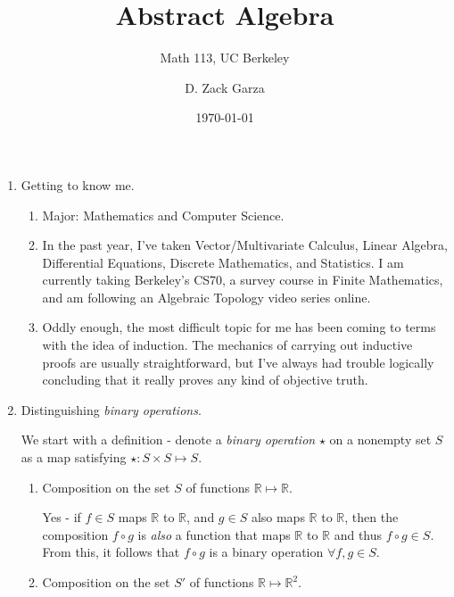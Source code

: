 \documentclass{scrartcl}
\author{D. Zack Garza}
\title{Abstract Algebra}
\subtitle{Math 113, UC Berkeley}
\date{\today}
\begin{document}
\maketitle

\begin{enumerate}

	\item Getting to know me.
	
	\begin{enumerate}
	
		\item Major: Mathematics and Computer Science.
		
		\item In the past year, I've taken Vector/Multivariate Calculus, Linear Algebra, Differential Equations, Discrete Mathematics, and Statistics. I am currently taking Berkeley's CS70, a survey course in Finite Mathematics, and am following an Algebraic Topology video series online.
		
		\item Oddly enough, the most difficult topic for me has been coming to terms with the idea of induction. The mechanics of carrying out inductive proofs are usually straightforward, but I've always had trouble logically concluding that it really proves any kind of objective truth.
		
	\end{enumerate}
	
	\item Distinguishing \textit{binary operations}.
	
		We start with a definition - denote a \textit{binary operation} $\star$ on a nonempty set $S$  as a map satisfying $\star : S \times S \mapsto S$.
	
		\begin{enumerate}
		
			\item Composition on the set $S$ of functions $\mathbb{R}\mapsto\mathbb{R}$.
			
				Yes - if $f \in S$ maps $\mathbb{R}$ to $\mathbb{R}$, and $g \in S$ also maps $\mathbb{R}$ to $\mathbb{R}$, then the composition $f \circ g$ is \textit{also} a function that maps $\mathbb{R}$ to $\mathbb{R}$ and thus $f \circ g \in S$. From this, it follows that $f \circ g$ is a binary operation $\forall f,g \in S$.
			
			\item Composition on the set $S'$ of functions $\mathbb{R}\mapsto\mathbb{R}^2$.
			

\end{enumerate}
\end{enumerate}
\end{document}
